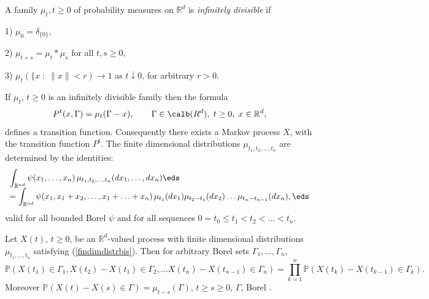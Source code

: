 \documentclass[preprint]{imsart}
\def\P{\mathbb P}
\def\R{\mathbb R}
\def\ds{\displaystyle}
\begin{document}
{\noindent A family $ \mu_t, t\geq 0$
of probability measures on $\R^d$ is
{\em infinitely divisible} if

1) $\mu_0=\delta_{\{0\}},$

2) $\mu_{t+s}=\mu_t*\mu_s$ for all $t,s\geq 0,$

3) $\mu_t(\{x\; : \; \|x\|<r)\to 1$ as $t\downarrow 0$, for arbitrary $r>0$.

\noindent If $\mu_t$, $t\geq 0$
 is an infinitely divisible family then the formula
\begin{equation}\label{sginvtrans}
  P^{t}(x,\Gamma)= \mu_t (\Gamma -x),
  \qquad \Gamma\in\calb (R^d),\; t\geq 0,\; x\in \R^d,
\end{equation}
defines a transition function. Consequently there exists a Markov
 process $X$, with the transition function
 $P^{t}$. The finite dimensional distributions $\mu_{t_1,t_2,\ldots ,t_n}$ are determined by the identities:
\begin{equation}\label{findimdistrbis}
  \begin{array}{l}\ds
\int_{\R^{nd}}\psi (x_1,\ldots,x_n)\,
 \mu_{t_1,t_2,\ldots ,t_n}(dx_1,\ldots,dx_n)
 \eds\\\ds
 =
\int_{\R^{nd}}\psi (x_1,x_1+x_2,\ldots,x_1+\ldots +x_n)\,
 \mu_{t_1}(dx_1)\mu_{t_2-t_1}(dx_2)\ldots
 \mu_{t_n-t_{n-1}}(dx_n),

 \eds
  \end{array}
\end{equation}
valid for all bounded Borel
$\psi$ and for
all  sequences $0=t_0\leq t_1 < t_2<\ldots <t_n$.

\begin{Proposition}
Let $X(t)$, $t\geq 0$, be an $\R^d$-valued process with
finite dimensional distributions $\mu_{t_1, \ldots
,t_n}$ satisfying (\ref{findimdistrbis}). Then for
arbitrary Borel sets $\Gamma_1,\ldots,\Gamma_n$,
\begin{equation}\label{indincrbis}
\P(X(t_1)\in\Gamma_1,X(t_2)-X(t_1)\in\Gamma_2,\ldots
X(t_n)-X(t_{n-1})\in\Gamma_n)\! =\!
\prod
_{k=1}^{n} \P(X(t_k)-X(t_{k-1})\in\Gamma_k).
\end{equation}
Moreover $\P(X(t)-X(s)\in\Gamma)=\mu_{t-s}(\Gamma)$,
$t\geq s \geq 0$, $\Gamma$, Borel .
\end{Proposition}


}
\end{document}
